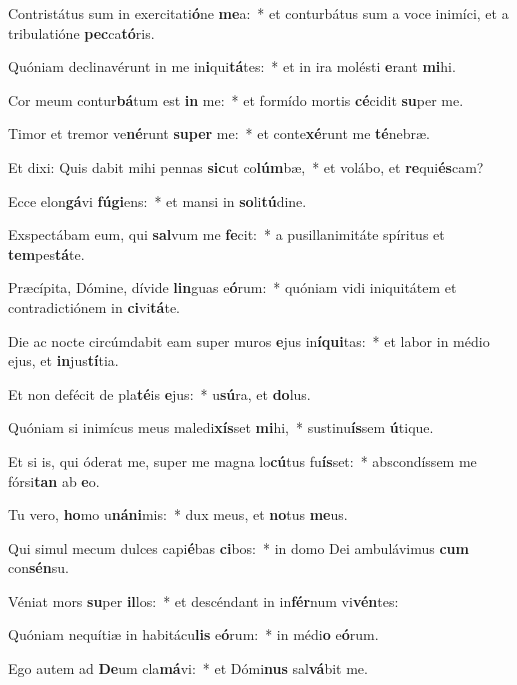 \item Contristátus sum in exercitati\textbf{ó}ne \textbf{me}a:~* et conturbátus sum a voce inimíci, et a tribulatióne \textbf{pec}ca\textbf{tó}ris.
\item Quóniam declinavérunt in me in\textbf{i}qui\textbf{tá}tes:~* et in ira molésti \textbf{e}rant \textbf{mi}hi.
\item Cor meum contur\textbf{bá}tum est \textbf{in} me:~* et formído mortis \textbf{cé}cidit \textbf{su}per me.
\item Timor et tremor ve\textbf{né}runt \textbf{su}\textbf{per} me:~* et conte\textbf{xé}runt me \textbf{té}nebræ.
\item Et dixi: Quis dabit mihi pennas \textbf{sic}ut co\textbf{lúm}bæ,~* et volábo, et \textbf{re}qui\textbf{és}cam?
\item Ecce elon\textbf{gá}vi \textbf{fú}\textbf{gi}ens:~* et mansi in \textbf{so}li\textbf{tú}dine.
\item Exspectábam eum, qui \textbf{sal}vum me \textbf{fe}cit:~* a pusillanimitáte spíritus et \textbf{tem}pes\textbf{tá}te.
\item Præcípita, Dómine, dívide \textbf{lin}guas e\textbf{ó}rum:~* quóniam vidi iniquitátem et contradictiónem in \textbf{ci}vi\textbf{tá}te.
\item Die ac nocte circúmdabit eam super muros \textbf{e}jus in\textbf{í}\textbf{qui}tas:~* et labor in médio ejus, et \textbf{in}jus\textbf{tí}tia.
\item Et non defécit de pla\textbf{té}is \textbf{e}jus:~* u\textbf{sú}ra, et \textbf{do}lus.
\item Quóniam si inimícus meus maledi\textbf{xís}set \textbf{mi}hi,~* sustinu\textbf{ís}sem \textbf{ú}tique.
\item Et si is, qui óderat me, super me magna lo\textbf{cú}tus fu\textbf{ís}set:~* abscondíssem me fórsi\textbf{tan} ab \textbf{e}o.
\item Tu vero, \textbf{ho}mo u\textbf{ná}\textbf{ni}mis:~* dux meus, et \textbf{no}tus \textbf{me}us.
\item Qui simul mecum dulces capi\textbf{é}bas \textbf{ci}bos:~* in domo Dei ambulávimus \textbf{cum} con\textbf{sén}su.
\item Véniat mors \textbf{su}per \textbf{il}los:~* et descéndant in in\textbf{fér}num vi\textbf{vén}tes:
\item Quóniam nequítiæ in habitácu\textbf{lis} e\textbf{ó}rum:~* in médi\textbf{o} e\textbf{ó}rum.
\item Ego autem ad \textbf{De}um cla\textbf{má}vi:~* et Dómi\textbf{nus} sal\textbf{vá}bit me.
